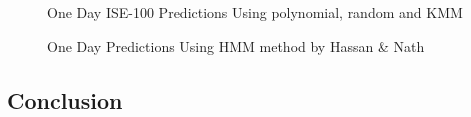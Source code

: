 \begin{figure}[!hbp]
\caption{\label{1day2}One Day ISE-100 Predictions Using polynomial, random and KMM}
\vspace{0.6cm}
\end{figure}


\begin{figure}[!hbp]
\caption{\label{1day5}One Day Predictions Using HMM method by Hassan \& Nath \cite{hassan}}
\label{1dayhassan}
\vspace{0.6cm}
\end{figure}


\subsection{Conclusion}

